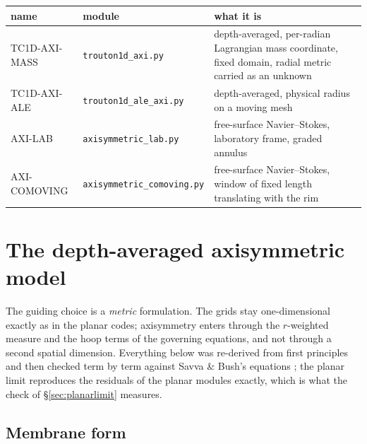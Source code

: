 \documentclass[11pt,a4paper]{article}
\newcommand{\MASS}{\textsf{TC1D-AXI-MASS}}
\newcommand{\ALE}{\textsf{TC1D-AXI-ALE}}
\newcommand{\LAB}{\textsf{AXI-LAB}}
\newcommand{\COM}{\textsf{AXI-COMOVING}}
\begin{document}
\begin{center}
\footnotesize
\begin{tabular}{@{}llp{}@{}}
\toprule
name & module & what it is \\
\midrule
\MASS & \texttt{trouton1d\_axi.py}
  & depth-averaged, per-radian Lagrangian mass coordinate, fixed domain,
    radial metric carried as an unknown \\
\ALE & \texttt{trouton1d\_ale\_axi.py}
  & depth-averaged, physical radius on a moving mesh \\
\LAB & \texttt{axisymmetric\_lab.py}
  & free-surface Navier--Stokes, laboratory frame, graded annulus \\
\COM & \texttt{axisymmetric\_comoving.py}
  & free-surface Navier--Stokes, window of fixed length translating with the
    rim \\
\bottomrule
\end{tabular}
\end{center}

\section{The depth-averaged axisymmetric model}
\label{sec:model}

The guiding choice is a \emph{metric} formulation. The grids stay
one-dimensional exactly as in the planar codes; axisymmetry enters through the
$r$-weighted measure and the hoop terms of the governing equations, and not
through a second spatial dimension. Everything below was re-derived from first
principles and then checked term by term against Savva \& Bush's equations
\cite{savva2009}; the planar limit reproduces the residuals of the planar
modules exactly, which is what the check of \S\ref{sec:planarlimit} measures.

\subsection{Membrane form}
\end{document}
